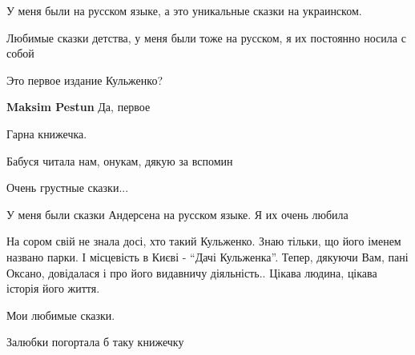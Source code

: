  
 
 
 
 

У меня были на русском языке, а это уникальные сказки на украинском.

Любимые сказки детства, у меня были тоже на русском, я их постоянно носила с собой

Это первое издание Кульженко?

\textbf{Maksim Pestun} Да, первое

Гарна книжечка.

Бабуся читала нам, онукам, дякую за вспомин

Очень грустные сказки...

У меня были сказки Андерсена на русском языке. Я их очень любила


На сором свій не знала досі, хто такий Кульженко. Знаю тільки, що його іменем
названо парки. І місцевість в Києві - \enquote{Дачі Кульженка}. Тепер, дякуючи Вам, пані
Оксано, довідалася і про його видавничу діяльність.. Цікава людина, цікава
історія його життя.

Мои любимые сказки.

Залюбки погортала б таку книжечку
